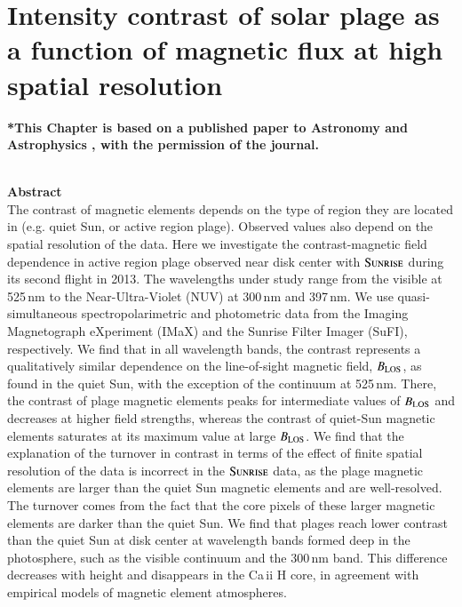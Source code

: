 \documentclass[goettingen, gauss, print]{thesis}
\begin{document}
\chapter{Intensity contrast of solar plage as a function of magnetic flux at high spatial resolution}

\textbf{*This Chapter is based on a published paper to Astronomy and Astrophysics \citep{kahil_intensity_2019}, with the permission of the journal.}\\ \\
\label{chapter_4}


\textbf{Abstract} \\

The contrast of magnetic elements depends on the type of region they are located in (e.g. quiet Sun, or active region plage). Observed values also depend on the spatial resolution of the data. Here we investigate the contrast-magnetic field dependence in active region plage observed near disk center with $\textsc{Sunrise}$ during its second flight in 2013. The wavelengths under study range from the visible at 525\,nm to the Near-Ultra-Violet (NUV) at 300\,nm and 397\,nm. We use quasi-simultaneous spectropolarimetric and photometric data from the Imaging Magnetograph eXperiment (IMaX) and the Sunrise Filter Imager (SuFI), respectively. We find that in all wavelength bands, the contrast represents a qualitatively similar dependence on the line-of-sight magnetic field, $B_{\rm LOS}$, as found in the quiet Sun, with the exception of the continuum at 525\,nm. There, the contrast of plage magnetic elements peaks for intermediate values of $B_{\rm LOS}$ and decreases at higher field strengths, whereas the contrast of quiet-Sun magnetic elements saturates at its maximum value at large $B_{\rm LOS}$. We find that the explanation of the turnover in contrast in terms of the effect of finite spatial resolution of the data is incorrect in the $\textsc{Sunrise}$ data, as the plage magnetic elements are larger than the quiet Sun magnetic elements and are well-resolved. The turnover comes from the fact that the core pixels of these larger magnetic elements are darker than the quiet Sun. We find that plages reach lower contrast than the quiet Sun at disk center at wavelength bands formed deep in the photosphere, such as the visible continuum and the 300\,nm band. This difference decreases with height and disappears in the Ca\,{\sc ii} H core, in agreement with empirical models of magnetic element atmospheres.
  
\end{document}
